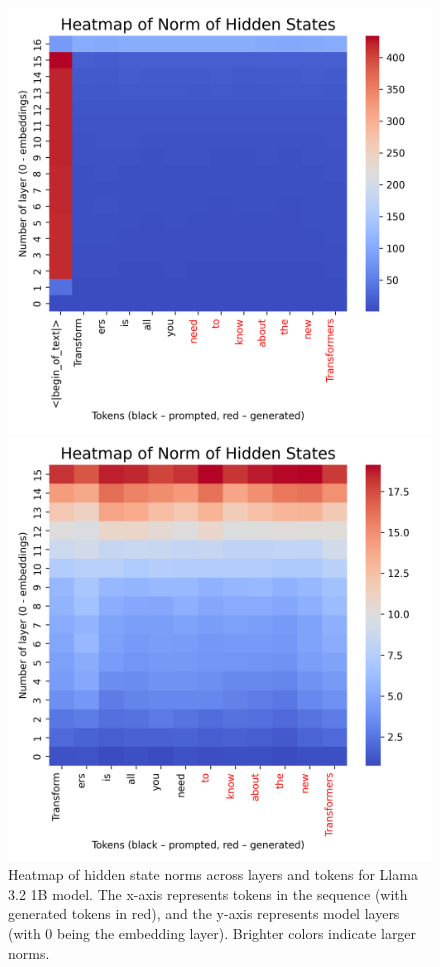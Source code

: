 \begin{figure}[t]
    \centering
    \begin{minipage}{0.48\textwidth}
        \centering
        \includegraphics[width=\textwidth]{images/heatmap_1b_full.png}
        \caption{Heatmap of hidden state norms across layers and tokens for Llama 3.2 1B model. The x-axis represents tokens in the sequence (with generated tokens in red), and the y-axis represents model layers (with 0 being the embedding layer). Brighter colors indicate larger norms.}
        \label{fig:heatmap_1b_full}
    \end{minipage}
    \hfill
    \begin{minipage}{0.48\textwidth}
        \centering
        \includegraphics[width=\textwidth]{images/heatmap_1b_notfull.png}

\end{minipage}
\end{figure}
